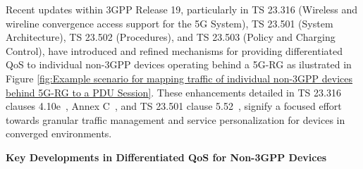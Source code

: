 Recent updates within \ac{3GPP} Release 19, particularly in TS 23.316 (Wireless and wireline convergence access support for the \ac{5G} System), TS 23.501 (System Architecture), TS 23.502 (Procedures), and TS 23.503 (Policy and Charging Control), have introduced and refined mechanisms for providing differentiated \ac{QoS} to individual non-\ac{3GPP} devices operating behind a \ac{5G-RG} as ilustrated in Figure \ref{fig:Example scenario for mapping traffic of individual non-3GPP devices behind 5G-RG to a PDU Session}. These enhancements detailed in TS 23.316 clauses 4.10e~\cite{23.316-p29}, Annex C~\cite{23.316-p95}, and TS 23.501 clause 5.52~\cite{23.502-p447}, signify a focused effort towards granular traffic management and service personalization for devices in converged environments.

\textbf{Key Developments in Differentiated \ac{QoS} for Non-\ac{3GPP} Devices}

